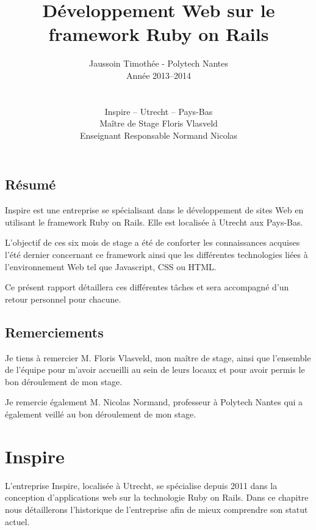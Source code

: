 \documentclass[12pt,a4paper]{book}
\author{Jaussoin Timothée - Polytech Nantes\\ Année 2013--2014 \\
\\ \\ Inspire -- Utrecht -- Pays-Bas\\  Maître de Stage Floris Vlasveld\\ Enseignant Responsable Normand Nicolas}
\title{Développement Web sur le framework Ruby on Rails}
\begin{document}
\begin{titlepage}
	\maketitle
\end{titlepage}

\tableofcontents

\newpage
\clearpage
{}
    \section*{Résumé}
  Inspire est une entreprise se spécialisant dans le développement de sites Web en utilisant le framework Ruby on Rails. Elle est localisée à Utrecht aux Pays-Bas.
  
  L'objectif de ces six mois de stage a été de conforter les connaissances acquises l'été dernier concernant ce framework ainsi que les différentes technologies liées à l'environnement Web tel que Javascript, CSS ou HTML.

    Ce présent rapport détaillera ces différentes tâches et sera accompagné d'un retour personnel pour chacune.  

\newpage
\clearpage
{}
\section*{Remerciements}

Je tiens à remercier M. Floris Vlasveld, mon maître de stage, ainsi que l'ensemble de l'équipe pour m'avoir accueilli au sein de leurs locaux et pour avoir permis le bon déroulement de mon stage.

Je remercie également M. Nicolas Normand, professeur à Polytech Nantes qui a également veillé au bon déroulement de mon stage.


\chapter{Inspire}

L'entreprise Inspire, localisée à Utrecht, se spécialise depuis 2011 dans la conception d'applications web sur la technologie Ruby on Rails. Dans ce chapitre nous détaillerons l'historique de l'entreprise afin de mieux comprendre son statut actuel.
\end{document}
